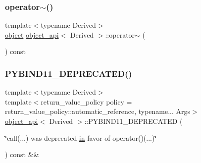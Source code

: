 \mbox{\label{classobject__api_a94189a6ba2cc0b6d6d37c15ab687020c}} 
\subsubsection{\texorpdfstring{operator$\sim$()}{operator~()}}
{\footnotesize\ttfamily template$<$typename Derived$>$ \\
\mbox{\hyperlink{classobject}{object}} \mbox{\hyperlink{classobject__api}{object\+\_\+api}}$<$ Derived $>$\+::operator$\sim$ (\begin{DoxyParamCaption}{ }\end{DoxyParamCaption}) const}

\mbox{\label{classobject__api_a805215f1a7d50f7fb6a6ffb723707c73}} 
\subsubsection{\texorpdfstring{PYBIND11\_DEPRECATED()}{PYBIND11\_DEPRECATED()}}
{\footnotesize\ttfamily template$<$typename Derived$>$ \\
template$<$return\+\_\+value\+\_\+policy policy = return\+\_\+value\+\_\+policy\+::automatic\+\_\+reference, typename... Args$>$ \\
\mbox{\hyperlink{classobject__api}{object\+\_\+api}}$<$ Derived $>$\+::P\+Y\+B\+I\+N\+D11\+\_\+\+D\+E\+P\+R\+E\+C\+A\+T\+ED (\begin{DoxyParamCaption}\item[{\char`\"{}call(...) was deprecated \mbox{\hyperlink{_s_d_l__opengl__glext_8h_a83ad0ee7f1e06b59c90271716e689080}{in}} favor of operator()(...)\char`\"{}}]{ }\end{DoxyParamCaption}) const \&\&}

\mbox{\label{classobject__api_ad342c9c181e1c9bdd634828276aebd24}} 
